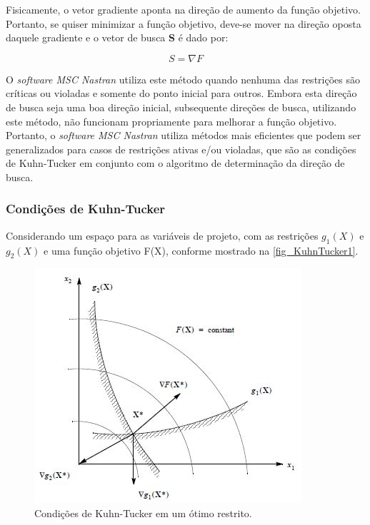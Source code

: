 Fisicamente, o vetor gradiente aponta na direção de aumento da função objetivo. Portanto, se quiser minimizar a função objetivo, deve-se mover na direção oposta daquele gradiente e o vetor de busca \textbf{S} é dado por:

\begin{equation} \label{otimization_7}
S = \nabla F
\end{equation}

O \emph{software MSC Nastran} utiliza este método quando nenhuma das restrições são críticas ou violadas e somente do ponto inicial para outros. Embora esta direção de busca seja uma boa direção inicial, subsequente direções de busca, utilizando este método, não funcionam propriamente para melhorar a função objetivo. Portanto, o \emph{software MSC Nastran} utiliza métodos mais eficientes que podem ser generalizados para casos de restrições ativas e/ou violadas, que são as condições de Kuhn-Tucker em conjunto com o algoritmo de determinação da direção de busca.

\subsubsection{Condições de Kuhn-Tucker}
Considerando um espaço para as variáveis de projeto, com as restrições $g_1(X)$ e $g_2(X)$ e uma função objetivo F(X), conforme mostrado na  \autoref{fig_KuhnTucker1}.

\begin{figure}[h]
	\caption{\label{fig_KuhnTucker1}Condições de Kuhn-Tucker em um ótimo restrito.}
  \centering
  \includegraphics[scale=0.71]{figura/KuhnTucker1}
\end{figure}
\

